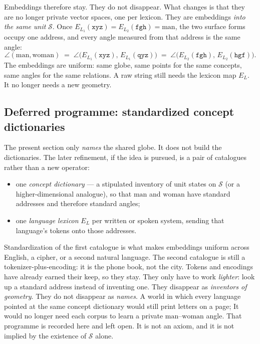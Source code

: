 \documentclass[12pt, a4paper]{article}
\begin{document}
Embeddings therefore stay. They do not disappear.
What changes is that they are no longer private vector spaces, one
per lexicon. They are embeddings \emph{into the same unit}
$\mathcal{S}$. Once $E_{L_1}(\texttt{xyz})=E_{L_2}(\texttt{fgh})=\mathrm{man}$,
the two surface forms occupy one address, and every angle measured
from that address is the same angle:
\begin{equation}
    \angle(\mathrm{man},\mathrm{woman})
    \;=\;
    \angle\bigl(E_{L_1}(\texttt{xyz}),\,E_{L_1}(\texttt{qyz})\bigr)
    \;=\;
    \angle\bigl(E_{L_2}(\texttt{fgh}),\,E_{L_2}(\texttt{hgf})\bigr).
    \label{eq:uniform_angles}
\end{equation}
The embeddings are uniform: same globe, same points for the same
concepts, same angles for the same relations. A raw string still
needs the lexicon map $E_L$. It no longer needs a new geometry.

\subsection{Deferred programme: standardized concept dictionaries}
\label{subsec:standard_dictionaries}
The present section only \emph{names} the shared globe. It does not
build the dictionaries. The later refinement, if the idea is pursued,
is a pair of catalogues rather than a new operator:
\begin{itemize}
    \item one \emph{concept dictionary} --- a stipulated inventory of
          unit states on $\mathcal{S}$ (or a higher-dimensional
          analogue), so that $\mathrm{man}$ and $\mathrm{woman}$ have
          standard addresses and therefore standard angles;
    \item one \emph{language lexicon} $E_L$ per written or spoken
          system, sending that language's tokens onto those addresses.
\end{itemize}
Standardization of the first catalogue is what makes embeddings
uniform across English, a cipher, or a second natural language.
The second catalogue is still a tokenizer-plus-encoding: it is the
phone book, not the city. Tokens and encodings have already earned
their keep, so they stay. They only have to work \emph{lighter}:
look up a standard address instead of inventing one. They disappear as
\emph{inventors of geometry}. They do not disappear as \emph{names}.
A world in which every language pointed at the same concept
dictionary would still print letters on a page; It would no longer need each 
corpus to learn a private $\mathrm{man}$--$\mathrm{woman}$ angle. 
That programme is recorded here and left open. It is not an
axiom, and it is not implied by the existence of $\mathcal{S}$ alone.
\end{document}
